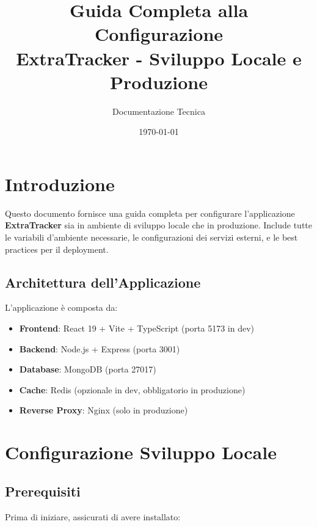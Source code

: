 \documentclass[11pt,a4paper]{article}
\title{
    \Huge\textbf{Guida Completa alla Configurazione}\\
    \Large ExtraTracker - Sviluppo Locale e Produzione
}
\author{Documentazione Tecnica}
\date{\today}
\begin{document}
\maketitle
\tableofcontents
\newpage

\section{Introduzione}

Questo documento fornisce una guida completa per configurare l'applicazione \textbf{ExtraTracker} sia in ambiente di sviluppo locale che in produzione. Include tutte le variabili d'ambiente necessarie, le configurazioni dei servizi esterni, e le best practices per il deployment.

\subsection{Architettura dell'Applicazione}

L'applicazione è composta da:
\begin{itemize}
    \item \textbf{Frontend}: React 19 + Vite + TypeScript (porta 5173 in dev)
    \item \textbf{Backend}: Node.js + Express (porta 3001)
    \item \textbf{Database}: MongoDB (porta 27017)
    \item \textbf{Cache}: Redis (opzionale in dev, obbligatorio in produzione)
    \item \textbf{Reverse Proxy}: Nginx (solo in produzione)
\end{itemize}

\section{Configurazione Sviluppo Locale}

\subsection{Prerequisiti}

Prima di iniziare, assicurati di avere installato:
\end{document}
